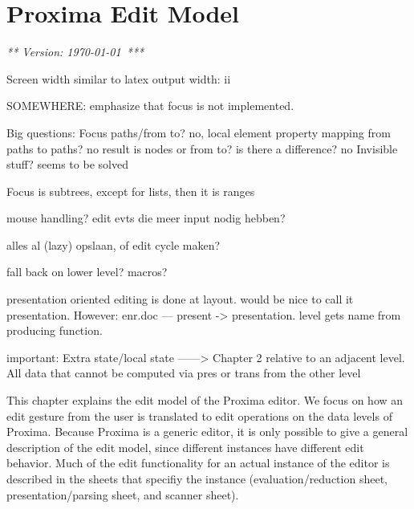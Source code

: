 \chapter{Proxima Edit Model}
\label{chap:editModel}

{\em *** Version: \today~***}

\bc

Screen width similar to latex output width:
ii                                                                                                                       


SOMEWHERE: emphasize that focus is not implemented.

Big questions:
Focus paths/from to? no, local element property
mapping from paths to paths? no
result is nodes or from to? is there a difference?  no
Invisible stuff?  seems to be solved


Focus is subtrees, except for lists, then it is ranges 

mouse handling?
edit evts die meer input nodig hebben?

alles al (lazy) opslaan, of edit cycle maken?

fall back on lower level?
macros?

presentation oriented editing is done at layout. 
would be nice to call it presentation. However:
enr.doc --- present -> presentation. level gets name from producing function. 

important: Extra state/local state    ------>  Chapter 2
relative to an adjacent level.
All data that cannot be computed via pres or trans from the other level
\ec



This chapter explains the edit model of the Proxima editor. We focus on how an edit gesture from the user is translated to edit operations on the data levels of Proxima. Because Proxima is a generic editor, it is only possible to give a general description of the edit model, since different instances have different edit behavior. Much of the edit functionality for an actual instance of the editor is described in the sheets that specifiy the instance (evaluation/reduction sheet, presentation/parsing sheet, and scanner sheet). 

